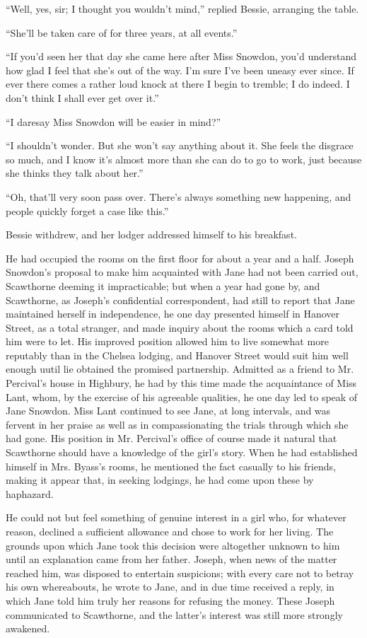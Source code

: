 ``Well, yes, sir; I thought you wouldn't mind,'' replied Bessie,
arranging the table.

``She'll be taken care of for three years, at all events.''

``If you'd seen her that day she came here after Miss Snowdon, you'd
understand how glad I feel that she's out of the way. I'm sure I've been
uneasy ever since. If ever there comes a rather loud knock at there I
begin to tremble; I do indeed. I don't think I shall ever get over it.''

{\protect\hypertarget{287}{}{}} ``I daresay Miss Snowdon will be easier
in mind?''

``I shouldn't wonder. But she won't say anything about it. She feels the
disgrace so much, and I know it's almost more than she can do to go to
work, just because she thinks they talk about her.''

``Oh, that'll very soon pass over. There's always something new
happening, and people quickly forget a case like this.''

Bessie withdrew, and her lodger addressed himself to his breakfast.

He had occupied the rooms on the first floor for about a year and a
half. Joseph Snowdon's proposal to make him acquainted with Jane had not
been carried out, Scawthorne deeming it impracticable; but when a year
had gone by, and Scawthorne, as Joseph's confidential correspondent, had
still to report that Jane maintained herself in independence, he one day
presented himself in Hanover Street, as a total stranger, and made
inquiry about the rooms which a card told him were to let. His improved
position allowed him to live somewhat more reputably than in the Chelsea
lodging, and Hanover Street would suit him
{\protect\hypertarget{288}{}{}} well enough uutil lie obtained the
promised partnership. Admitted as a friend to Mr. Percival's house in
Highbury, he had by this time made the acquaintance of Miss Lant, whom,
by the exercise of his agreeable qualities, he one day led to speak of
Jane Snowdon. Miss Lant continued to see Jane, at long intervals, and
was fervent in her praise as well as in compassionating the trials
through which she had gone. His position in Mr. Percival's office of
course made it natural that Scawthorne should have a knowledge of the
girl's story. When he had established himself in Mrs. Byass's rooms, he
mentioned the fact casually to his friends, making it appear that, in
seeking lodgings, he had come upon these by haphazard.

He could not but feel something of genuine interest in a girl who, for
whatever reason, declined a sufficient allowance and chose to work for
her living. The grounds upon which Jane took this decision were
altogether unknown to him until an explanation came from her father.
Joseph, when news of the matter reached him, was disposed to entertain
suspicions; with every care not to betray his own whereabouts, he wrote
to Jane, and in due {\protect\hypertarget{289}{}{}} time received a
reply, in which Jane told him truly her reasons for refusing the money.
These Joseph communicated to Scawthorne, and the latter's interest was
still more strongly awakened.


